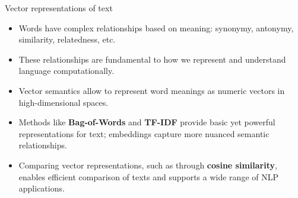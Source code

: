 \documentclass{beamer}
\begin{document}
\begin{frame}{Vector representations of text}
    \begin{itemize}
        \item Words have complex relationships based on meaning: synonymy, antonymy, similarity, relatedness, etc.
        \item These relationships are fundamental to how we represent and understand language computationally.
        \item Vector semantics allow to represent word meanings as numeric vectors in high-dimensional spaces.
        \item Methods like \textbf{Bag-of-Words} and \textbf{TF-IDF} provide basic yet powerful representations for text; embeddings capture more nuanced semantic relationships.
        \item Comparing vector representations, such as through \textbf{cosine similarity}, enables efficient comparison of texts and supports a wide range of NLP applications.
    \end{itemize}
\end{frame}
\end{document}
